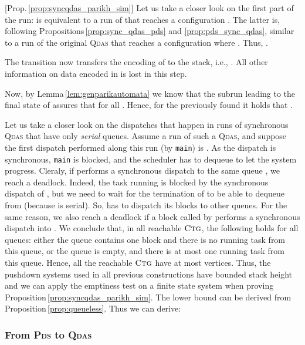 \documentclass[runningheads,oribibl,]{article}
\newcommand{\pds}{\textsc{Pds}\xspace}
\newcommand{\qdas}{\textsc{Qdas}\xspace}
\newcommand{\ctg}{\ensuremath{\textsc{Ctg}}\xspace}
\newenvironment{proof}{\noindent{\it Proof.\hspace*{.5cm}}}{}
\newcommand{\qed}{\hfill}
\begin{document}
\begin{proof}[Prop.\,\ref{prop:syncqdas_parikh_sim}]
  Let us take a closer look on the first part of the run:
   is equivalent to a run of
   that reaches a configuration . The latter is,
  following Propositions\,\ref{prop:sync_qdas_pds} and \ref{prop:pds_sync_qdas}, similar to a run of the
  original \qdas  that reaches a configuration  where
  . Thus, .

  The transition  now transfers the
  encoding of  to the stack, i.e., .
  All other information on data encoded in  is lost in this step.

  Now, by Lemma\,\ref{lem:genparikautomata} we know that the subrun
   leading to the final
  state of  assures that
   for all  . Hence, for the previously found
    it holds that .\qed
\end{proof}







Let us take a closer look on the dispatches that happen in runs of
synchronous \qdas that have only \emph{serial} queues. Assume a run of
such a \qdas, and suppose the first dispatch performed along this run
(by \texttt{main}) is . As the dispatch is
synchronous, \texttt{main} is blocked, and the scheduler has to
dequeue  to let the system progress. Cleraly, if 
performs a synchronous dispatch  to the same queue
, we reach a deadlock. Indeed, the task running  is blocked
by the synchronous dispatch of , but we need to wait for the
termination of  to be able to dequeue  from 
(because  is serial). So,  has to dispatch its blocks to
other queues. For the same reason, we also reach a deadlock if a block
called by  performs a synchronous dispatch into . We
conclude that, in all reachable \ctg, the following holds for all
queues: either the queue contains one block and there is no running
task from this queue, or the queue is empty, and there is at most one
running task from this queue.  Hence, all the reachable \ctg have at
most  vertices.  Thus, the pushdown systems used
in all previous constructions have bounded stack height and we can
apply the emptiness test on a finite state system when proving
Proposition\,\ref{prop:syncqdas_parikh_sim}.  The lower bound can be
derived from Proposition\,\ref{prop:queueless}. Thus we can derive:

\propsyncqdasparikhsim*

\subsubsection{From \pds to \qdas}
\end{document}

